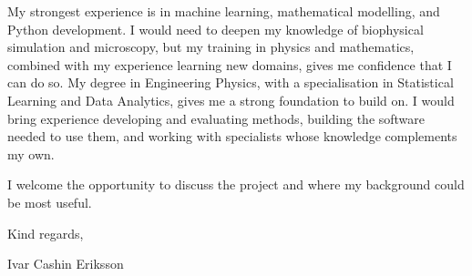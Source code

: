 \documentclass[11pt,a4paper]{moderncv}
\begin{document}
\vspace{4pt}
\hspace*{2em}
My strongest experience is in machine learning, mathematical modelling, and Python development. I would need to deepen my knowledge of biophysical simulation and microscopy, but my training in physics and mathematics, combined with my experience learning new domains, gives me confidence that I can do so. My degree in Engineering Physics, with a specialisation in Statistical Learning and Data Analytics, gives me a strong foundation to build on. I would bring experience developing and evaluating methods, building the software needed to use them, and working with specialists whose knowledge complements my own.

\vspace*{2em}
I welcome the opportunity to discuss the project and where my background could be most useful.

\vspace{2em}
Kind regards, 

Ivar Cashin Eriksson
\end{document}
